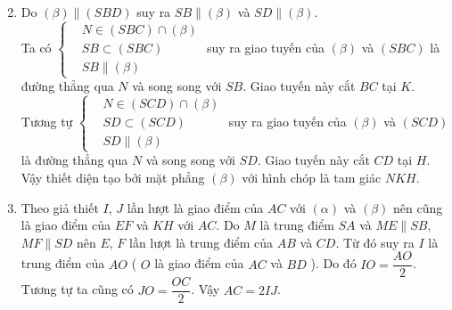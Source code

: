 \begin{bt}
{{
		}
		\noindent
		\begin{enumerate}
			\setcounter{enumi}{1}
			\item Do $\left(\beta \right)\parallel (SBD)$ suy ra $SB\parallel \left(\beta \right)$ và $SD\parallel \left(\beta \right)$. \\
			Ta có $\left\{\begin{aligned} &N\in (SBC)\cap \left(\beta \right) \\ &SB\subset (SBC) \\ &SB\parallel \left(\beta \right)
			\end{aligned}\right.$ suy ra giao tuyến của $\left(\beta \right)$ và $(SBC)$ là đường thẳng qua $N$ và song song với $SB$. Giao tuyến này cắt $BC$ tại $K$. \\
			Tương tự $\left\{\begin{aligned} &N\in (SCD)\cap \left(\beta \right) \\ &SD\subset (SCD) \\ &SD\parallel \left(\beta \right)
			\end{aligned}\right.$ suy ra giao tuyến của $\left(\beta \right)$ và $(SCD)$ là đường thẳng qua $N$ và song song với $SD$. Giao tuyến này cắt $CD$ tại $H$. \\
			Vậy thiết diện tạo bởi mặt phẳng $\left(\beta \right)$ với hình chóp là tam giác $NKH$.
			\item Theo giả thiết $I$, $J$ lần lượt là giao điểm của $AC$ với $\left(\alpha \right)$ và $\left(\beta \right)$ nên cũng là giao điểm của $EF$ và $KH$ với $AC$. Do $M$ là trung điểm $SA$ và $ME\parallel SB$, $MF\parallel SD$ nên $E$, $F$ lần lượt là trung điểm của $AB$ và $CD$. Từ đó suy ra $I$ là trung điểm của $AO$ ( $O$ là giao điểm của $AC$ và $BD$ ). Do đó $IO=\dfrac{AO}{2}$. \\
			Tương tự ta cũng có $JO=\dfrac{OC}{2}$. Vậy $AC=2IJ$.
		\end{enumerate}
	}
\end{bt}

